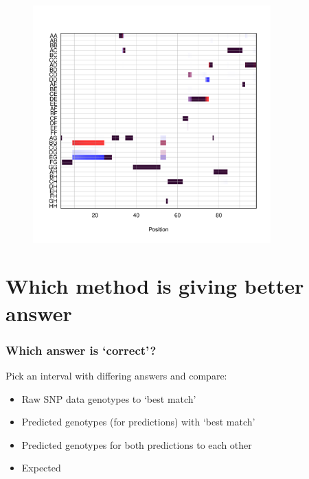 \documentclass[12pt,t]{beamer}
\begin{document}
	
	\begin{frame}
		\begin{figure}
			{\includegraphics[height=3.6in, width=3.6in]{figures/probs_compare_171.pdf}} 
		\end{figure}	
	\end{frame}


\section{Which method is giving better answer}

	\begin{frame}
		\frametitle{Which answer is `correct'?}
			Pick an interval with differing answers and compare:
			\begin{itemize}
				\item Raw SNP data genotypes to `best match' \\
				\item Predicted genotypes (for predictions) with `best match'
				\item Predicted genotypes for both predictions to each other\\
				\item Expected 
				
				
			\end{itemize}
	\end{frame}
	
\end{document}
